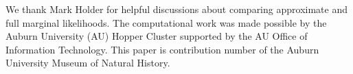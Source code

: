 We thank Mark Holder for helpful discussions about comparing approximate and
full marginal likelihoods.
The computational work was made possible by the Auburn University (AU) Hopper
Cluster supported by the AU Office of Information Technology.
This paper is contribution number  of the Auburn University
Museum of Natural History.

